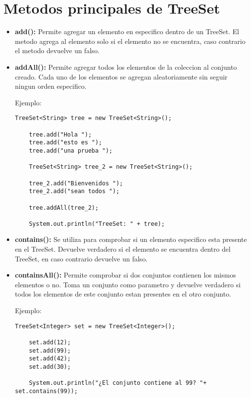 \documentclass[12pt, letterpaper]{article} %
\begin{document}
\section*{Metodos principales de TreeSet}
\begin{itemize}
    \item \textbf{add():} Permite agregar un elemento en especifico dentro de un TreeSet. El metodo agrega al elemento solo si el elemento no se encuentra, caso contrario el metodo devuelve un falso.
    
    \item \textbf{addAll():} Permite agregar todos los elementos de la coleccion al conjunto creado. Cada uno de los elementos se agregan aleatoriamente sin seguir ningun orden especifico.
    
    Ejemplo:
    \lstset{language = Java, breaklines=true, basicstyle=\footnotesize}
    \begin{lstlisting}[frame=single]
    TreeSet<String> tree = new TreeSet<String>();

    tree.add("Hola ");
    tree.add("esto es ");
    tree.add("una prueba ");

    TreeSet<String> tree_2 = new TreeSet<String>();

    tree_2.add("Bienvenidos ");
    tree_2.add("sean todos ");

    tree.addAll(tree_2);

    System.out.println("TreeSet: " + tree);
    \end{lstlisting}

    \item \textbf{contains():} Se utiliza para comprobar si un elemento especifico esta presente en el TreeSet. Devuelve verdadero si el elemento se encuentra dentro del TreeSet, en caso contrario devuelve un falso.

    \item \textbf{containsAll():} Permite comprobar si dos conjuntos contienen los mismos elementos o no. Toma un conjunto como parametro y devuelve verdadero si todos los elementos de este conjunto estan presentes en el otro conjunto.
    
    Ejemplo:
    \lstset{language = Java, breaklines=true, basicstyle=\footnotesize}
    \begin{lstlisting}[frame=single]
    TreeSet<Integer> set = new TreeSet<Integer>();

    set.add(12);
    set.add(99);
    set.add(42);
    set.add(30);

    System.out.println("¿El conjunto contiene al 99? "+ set.contains(99));


\end{lstlisting}
\end{itemize}
\end{document}
